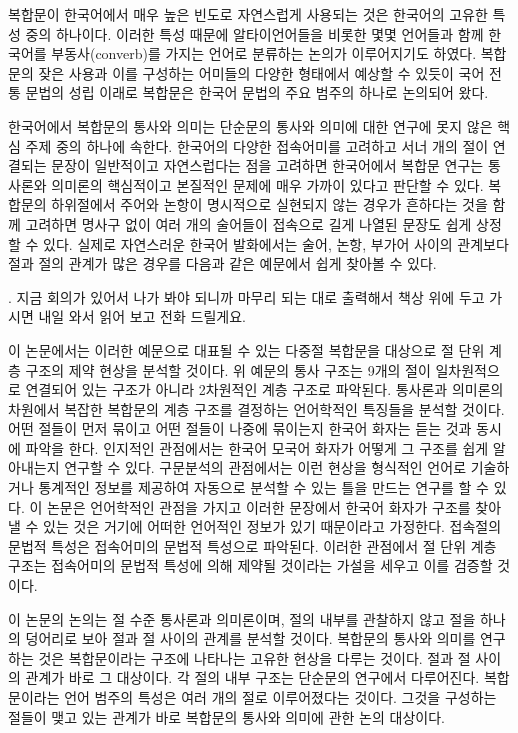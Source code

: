 복합문이 한국어에서 매우 높은 빈도로 자연스럽게 사용되는 것은 한국어의 고유한
특성 중의 하나이다. 이러한 특성 때문에 알타이언어들을 비롯한 몇몇 언어들과 함께
한국어를 부동사(converb)를 가지는 언어로 분류하는 논의가 이루어지기도 하였다.
복합문의 잦은 사용과 이를 구성하는 어미들의 다양한 형태에서 예상할 수 있듯이
국어 전통 문법의 성립 이래로 복합문은 한국어 문법의 주요 범주의 하나로 논의되어
왔다.

한국어에서 복합문의 통사와 의미는 단순문의 통사와 의미에 대한 연구에 못지 않은
핵심 주제 중의 하나에 속한다. 한국어의 다양한 접속어미를 고려하고 서너 개의
절이 연결되는 문장이 일반적이고 자연스럽다는 점을 고려하면 한국어에서 복합문
연구는 통사론와 의미론의 핵심적이고 본질적인 문제에 매우 가까이 있다고 판단할
수 있다. 복합문의 하위절에서 주어와 논항이 명시적으로 실현되지 않는 경우가
흔하다는 것을 함께 고려하면 명사구 없이 여러 개의 술어들이 접속으로 길게 나열된
문장도 쉽게 상정할 수 있다. 실제로 자연스러운 한국어 발화에서는 술어, 논항,
부가어 사이의 관계보다 절과 절의 관계가 많은 경우를 다음과 같은 예문에서 쉽게
찾아볼 수 있다.


\ex. 지금 회의가 있어서 나가 봐야 되니까 마무리 되는 대로 출력해서
책상 위에 두고 가시면 내일 와서 읽어 보고 전화 드릴게요.


이 논문에서는 이러한 예문으로 대표될 수 있는 다중절 복합문을 대상으로 절 단위
계층 구조의 제약 현상을 분석할 것이다. 위 예문의 통사 구조는 9개의 절이
일차원적으로 연결되어 있는 구조가 아니라 2차원적인 계층 구조로 파악된다.
통사론과 의미론의 차원에서 복잡한 복합문의 계층 구조를 결정하는 언어학적인
특징들을 분석할 것이다. 어떤 절들이 먼저 묶이고 어떤 절들이 나중에 묶이는지
한국어 화자는 듣는 것과 동시에 파악을 한다. 인지적인 관점에서는 한국어 모국어
화자가 어떻게 그 구조를 쉽게 알아내는지 연구할 수 있다. 구문분석의 관점에서는
이런 현상을 형식적인 언어로 기술하거나 통계적인 정보를 제공하여 자동으로 분석할
수 있는 틀을 만드는 연구를 할 수 있다. 이 논문은 언어학적인 관점을 가지고
이러한 문장에서 한국어 화자가 구조를 찾아낼 수 있는 것은 거기에 어떠한 언어적인
정보가 있기 때문이라고 가정한다. 접속절의 문법적 특성은 접속어미의 문법적
특성으로 파악된다. 이러한 관점에서 절 단위 계층 구조는 접속어미의 문법적 특성에
의해 제약될 것이라는 가설을 세우고 이를 검증할 것이다.

이 논문의 논의는 절 수준 통사론과 의미론이며, 절의 내부를 관찰하지 않고 절을
하나의 덩어리로 보아 절과 절 사이의 관계를 분석할 것이다. 복합문의 통사와
의미를 연구하는 것은 복합문이라는 구조에 나타나는 고유한 현상을 다루는 것이다.
절과 절 사이의 관계가 바로 그 대상이다. 각 절의 내부 구조는 단순문의 연구에서
다루어진다. 복합문이라는 언어 범주의 특성은 여러 개의 절로 이루어졌다는
것이다. 그것을 구성하는 절들이 맺고 있는 관계가 바로 복합문의 통사와 의미에
관한 논의 대상이다.

